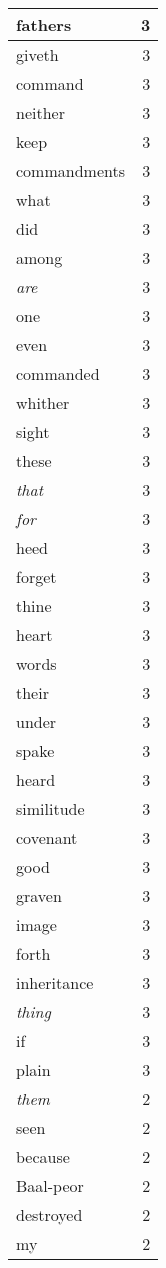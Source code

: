 \begin{center}
\begin{longtable}{l|r}
fathers & 3 \\ \hline
giveth & 3 \\ \hline
command & 3 \\ \hline
neither & 3 \\ \hline
keep & 3 \\ \hline
commandments & 3 \\ \hline
what & 3 \\ \hline
did & 3 \\ \hline
among & 3 \\ \hline
\emph{are} & 3 \\ \hline
one & 3 \\ \hline
even & 3 \\ \hline
commanded & 3 \\ \hline
whither & 3 \\ \hline
sight & 3 \\ \hline
these & 3 \\ \hline
\emph{that} & 3 \\ \hline
\emph{for} & 3 \\ \hline
heed & 3 \\ \hline
forget & 3 \\ \hline
thine & 3 \\ \hline
heart & 3 \\ \hline
words & 3 \\ \hline
their & 3 \\ \hline
under & 3 \\ \hline
spake & 3 \\ \hline
heard & 3 \\ \hline
similitude & 3 \\ \hline
covenant & 3 \\ \hline
good & 3 \\ \hline
graven & 3 \\ \hline
image & 3 \\ \hline
forth & 3 \\ \hline
inheritance & 3 \\ \hline
\emph{thing} & 3 \\ \hline
if & 3 \\ \hline
plain & 3 \\ \hline
\emph{them} & 2 \\ \hline
seen & 2 \\ \hline
because & 2 \\ \hline
Baal-peor & 2 \\ \hline
destroyed & 2 \\ \hline
my & 2 \\ \hline

\end{longtable}
\end{center}
